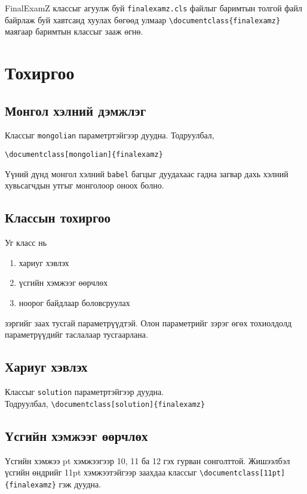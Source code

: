 \documentclass[10pt]{article}
\theoremstyle{definition}
\begin{document}
FinalExamZ классыг агуулж буй \texttt{finalexamz.cls} файлыг баримтын толгой файл байрлаж буй хавтсанд хуулах бөгөөд улмаар \verb|\documentclass{finalexamz}| маягаар баримтын классыг зааж өгнө.

\section{Тохиргоо}

\subsection{Монгол хэлний дэмжлэг}

Классыг \texttt{mongolian} параметртэйгээр дуудна. Тодруулбал,
\begin{verbatim}
\documentclass[mongolian]{finalexamz}
\end{verbatim}
Үүний дүнд монгол хэлний \texttt{babel} багцыг дуудахаас гадна загвар дахь хэлний хувьсагчдын утгыг монголоор оноох болно.

\subsection{Классын тохиргоо}

Уг класс нь
\begin{enumerate}
 \item хариуг хэвлэх
 \item үсгийн хэмжээг өөрчлөх
 \item ноорог байдлаар боловсруулах
\end{enumerate}
зэргийг заах тусгай параметрүүдтэй. Олон параметрийг зэрэг өгөх тохиолдолд параметрүүдийг таслалаар тусгаарлана.

\subsection{Хариуг хэвлэх}

Классыг \texttt{solution} параметртэйгээр дуудна. \\ Тодруулбал, \verb|\documentclass[solution]{finalexamz}|

\subsection{Үсгийн хэмжээг өөрчлөх}

Үсгийн хэмжээ pt хэмжээгээр 10, 11 ба 12 гэх гурван сонголттой. Жишээлбэл үсгийн өндрийг 11pt хэмжээтэйгээр заахдаа классыг \verb|\documentclass[11pt]{finalexamz}| гэж дуудна.
\end{document}
